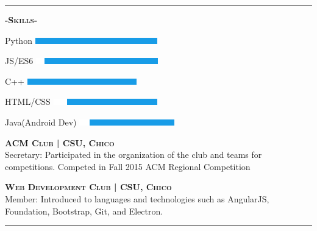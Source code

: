 \documentclass[12pt]{article}
\begin{document}
\noindent\rule{19cm}{0.4pt}
\bigskip
\begin{multicols}{2}
\begin{center}
\textbf{\textsc{-Skills-}}

\flushleft
Python
\hfill
\includegraphics{C++Skill}\\
\smallskip

JS/ES6
\hfill
\includegraphics{PythonSkill}\\
\smallskip

C++
\hfill
\includegraphics{JSSkill}\\
\smallskip

HTML/CSS
\hfill
\includegraphics{HTMLSkill}\\
\smallskip

Java(Android Dev)
\hfill
\includegraphics{JavaSkill}\\
\smallskip

\end{center}

\columnbreak

\center
\footnotesize
\color{black}\textsc{\textbf{ACM Club | CSU, Chico}}\\
\flushleft
\color{Cerulean}Secretary: \color{gray} Participated in the organization of the club and teams for competitions. Competed in Fall 2015 ACM Regional Competition

\center
\color{black}\textsc{\textbf{Web Development Club | CSU, Chico}}\\
\flushleft
\color{Cerulean}Member: \color{gray}Introduced to languages and technologies such as AngularJS, Foundation, Bootstrap, Git, and Electron.


\end{multicols}

\noindent\rule{19cm}{0.4pt}
\end{document}
